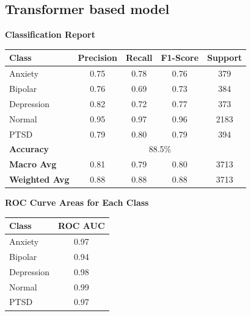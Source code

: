 \subsection{Transformer based model}
\begin{center}
    \textbf{Classification Report} \\[0.5em]
    \begin{tabular}{|l|c|c|c|c|}
        \hline
        \textbf{Class} & \textbf{Precision} & \textbf{Recall} & \textbf{F1-Score} & \textbf{Support} \\ \hline
        Anxiety        & 0.75               & 0.78            & 0.76              & 379             \\ \hline
        Bipolar        & 0.76               & 0.69            & 0.73              & 384             \\ \hline
        Depression     & 0.82               & 0.72            & 0.77              & 373             \\ \hline
        Normal         & 0.95               & 0.97            & 0.96              & 2183            \\ \hline
        PTSD           & 0.79               & 0.80            & 0.79              & 394             \\ \hline
        \textbf{Accuracy} & \multicolumn{4}{|c|}{88.5\%} \\ \hline
        \textbf{Macro Avg} & 0.81            & 0.79            & 0.80              & 3713            \\ \hline
        \textbf{Weighted Avg} & 0.88         & 0.88            & 0.88              & 3713            \\ \hline
    \end{tabular}
\end{center}

\begin{center}
    \textbf{ROC Curve Areas for Each Class} \\[0.5em]
    \begin{tabular}{|l|c|}
        \hline
        \textbf{Class}  & \textbf{ROC AUC} \\ \hline
        Anxiety         & 0.97            \\ \hline
        Bipolar         & 0.94            \\ \hline
        Depression      & 0.98            \\ \hline
        Normal          & 0.99            \\ \hline
        PTSD            & 0.97            \\ \hline
    \end{tabular}
\end{center}

